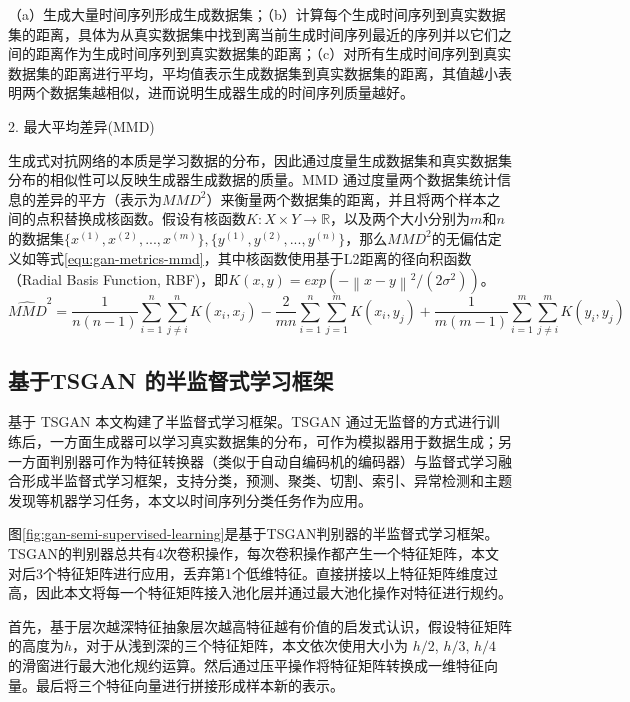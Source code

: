 （a）生成大量时间序列形成生成数据集；（b）计算每个生成时间序列到真实数据集的距离，具体为从真实数据集中找到离当前生成时间序列最近的序列并以它们之间的距离作为生成时间序列到真实数据集的距离；（c）对所有生成时间序列到真实数据集的距离进行平均，平均值表示生成数据集到真实数据集的距离，其值越小表明两个数据集越相似，进而说明生成器生成的时间序列质量越好。

2. 最大平均差异(MMD)

生成式对抗网络的本质是学习数据的分布，因此通过度量生成数据集和真实数据集分布的相似性可以反映生成器生成数据的质量。MMD 通过度量两个数据集统计信息的差异的平方（表示为$MMD^{2}$）来衡量两个数据集的距离，并且将两个样本之间的点积替换成核函数。假设有核函数$K: X \times Y \rightarrow \mathbb{R}$，以及两个大小分别为$m$和$n$的数据集$\{x^{(1)},x^{(2)},...,x^{(m)}\}, \{y^{(1)},y^{(2)},...,y^{(n)}\}$，那么$MMD^{2}$的无偏估定义如等式\ref{equ:gan-metrics-mmd}，其中核函数使用基于L2距离的径向积函数（Radial Basis Function, RBF)，即$K(x, y) = exp(-\left \| x-y \right \|^{2} / (2\sigma ^{2}))$。
\begin{equation}
\hat{MMD}^{2} = \frac{1}{n(n-1)}\sum_{i=1}^{n}\sum_{j\neq i}^{n}K(x_{i}, x_{j}) - \frac{2}{mn}\sum_{i=1}^{n}\sum_{j=1}^{m}K(x_{i}, y_{j}) + \frac{1}{m(m-1)}\sum_{i=1}^{m}\sum_{j\neq i}^{m}K(y_{i}, y_{j}) \label{equ:gan-metrics-mmd} 
\end{equation}

\subsection{基于TSGAN 的半监督式学习框架}

基于 TSGAN 本文构建了半监督式学习框架。TSGAN 通过无监督的方式进行训练后，一方面生成器可以学习真实数据集的分布，可作为模拟器用于数据生成；另一方面判别器可作为特征转换器（类似于自动自编码机的编码器）与监督式学习融合形成半监督式学习框架，支持分类，预测、聚类、切割、索引、异常检测和主题发现等机器学习任务，本文以时间序列分类任务作为应用。

图\ref{fig:gan-semi-supervised-learning}是基于TSGAN判别器的半监督式学习框架。TSGAN的判别器总共有4次卷积操作，每次卷积操作都产生一个特征矩阵，本文对后3个特征矩阵进行应用，丢弃第1个低维特征。直接拼接以上特征矩阵维度过高，因此本文将每一个特征矩阵接入池化层并通过最大池化操作对特征进行规约。

首先，基于层次越深特征抽象层次越高特征越有价值的启发式认识，假设特征矩阵的高度为$h$，对于从浅到深的三个特征矩阵，本文依次使用大小为 $h/2$, $h/3$, $h/4$ 的滑窗进行最大池化规约运算。然后通过压平操作将特征矩阵转换成一维特征向量。最后将三个特征向量进行拼接形成样本新的表示。

